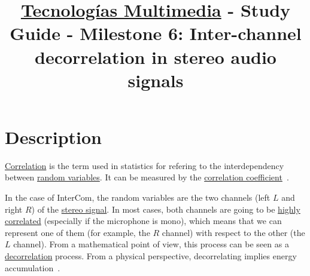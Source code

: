 \title{\href{https://www.ual.es/estudios/grados/presentacion/plandeestudios/asignatura/4015/40154321?idioma=zh_CN}{Tecnologías Multimedia} - Study Guide - Milestone 6: Inter-channel decorrelation in stereo audio signals}

\maketitle

\section{Description}

\href{https://en.wikipedia.org/wiki/Correlation_and_dependence}{Correlation}
is the term used in statistics for refering to the interdependency
between \href{https://en.wikipedia.org/wiki/Random_variable}{random
  variables}. It can be measured by the
\href{https://www.mathsisfun.com/data/correlation.html}{correlation
  coefficient}~\cite{thinkstats}.

In the case of InterCom, the random variables are the two channels
(left $L$ and right $R$) of the
\href{https://en.wikipedia.org/wiki/Stereophonic_sound}{stereo
  signal}. In most cases, both channels are going to be
\href{https://en.wikipedia.org/wiki/Binaural_recording}{highly
  correlated} (especially if the microphone is mono), which means that
we can represent one of them (for example, the $R$ channel) with
respect to the other (the $L$ channel). From a mathematical point
of view, this process can be seen as a
\href{https://en.wikipedia.org/wiki/Decorrelation}{decorrelation}
process. From a physical perspective, decorrelating implies energy
accumulation~\cite{sayood2017introduction}.


